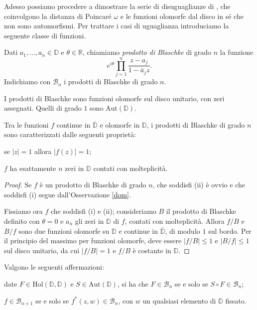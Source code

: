 Adesso possiamo procedere a dimostrare la serie di disuguaglianze di \cite{BM}, che coinvolgono la distanza di Poincaré $\omega$ e le funzioni olomorfe dal disco in sé che non sono automorfismi. Per trattare i casi di uguaglianza introduciamo la seguente classe di funzioni.

\begin{defn}
  Dati $a_1,\dots,a_n \in \mathbb{D}$ e $\theta \in \mathbb{R}$, chiamiamo \textit{prodotto di Blaschke} di grado $n$ la funzione
  $$e^{i\theta}\prod_{j=1}^n \frac{z-a_j}{1-\bar{a}_jz}.$$
  Indichiamo con $\mathcal{B}_n$ i prodotti di Blaschke di grado $n$.
\end{defn}

\begin{oss}
  I prodotti di Blaschke sono funzioni olomorfe sul disco unitario, con zeri assegnati. Quelli di grado $1$ sono $\text{Aut}(\mathbb{D})$.
\end{oss}

\begin{lm} \label{Blaschke-car}
  Tra le funzioni $f$ continue in $\overline{\mathbb{D}}$ e olomorfe in $\mathbb{D}$, i prodotti di Blaschke di grado $n$ sono caratterizzati dalle seguenti proprietà:
  \begin{nlist}
    \item se $|z|=1$ allora $|f(z)|=1$;
    \item $f$ ha esattamente $n$ zeri in $\mathbb{D}$ contati con molteplicità.
  \end{nlist}
\end{lm}

\begin{proof}
  Se $f$ è un prodotto di Blaschke di grado $n$, che soddisfi (ii) è ovvio e che soddisfi (i) segue dall'Osservazione \ref{dom}.

  Fissiamo ora $f$ che soddisfi (i) e (ii); consideriamo $B$ il prodotto di Blaschke definito con $\theta=0$ e $a_n$ gli zeri in $\mathbb{D}$ di $f$, contati con molteplicità. Allora $f/B$ e $B/f$ sono due funzioni olomorfe su $\mathbb{D}$ e continue in $\overline{\mathbb{D}}$, di modulo $1$ sul bordo. Per il principio del massimo per funzioni olomorfe, deve essere $|f/B| \le 1$ e $|B/f| \le 1$ sul disco unitario, da cui $|f/B|=1$ e $f/B$ è costante in $\mathbb{D}$.
\end{proof}

\begin{prop} \label{blaschke-prop}
  Valgono le seguenti affermazioni:
  \begin{nlist}
    \item date $F \in \text{Hol}(\mathbb{D},\mathbb{D})$ e $S \in \text{Aut}(\mathbb{D})$, si ha che $F \in \mathcal{B}_n$ se e solo se $S\circ F \in \mathcal{B}_n$;
    \item $f \in \mathcal{B}_{n+1}$ se e solo se $f^*(z,w) \in \mathcal{B}_n$, con $w$ un qualsiasi elemento di $\mathbb{D}$ fissato.
  \end{nlist}
\end{prop}

